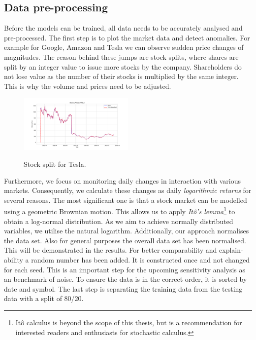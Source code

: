 \documentclass[12pt]{article}
\begin{document}
\subsection{Data pre-processing} %
\label{subsec:dataPre}
Before the models can be trained, all data needs to be accurately analysed and pre-processed. The first step is to plot the market data and detect anomalies. For example for Google, Amazon and Tesla we can observe sudden price changes of magnitudes. The reason behind these jumps are stock splits, where shares are split by an integer value to issue more stocks by the company. Shareholders do not lose value as the number of their stocks is multiplied by the same integer. This is why the volume and prices need to be adjusted.

\begin{figure}[h]
\centering
\includegraphics[width=0.50\textwidth]{figs/ctien_split.pdf}   \\
\caption{ Stock split for Tesla.}
\label{fig:finalnw}
\end{figure}

Furthermore, we focus on monitoring daily changes in interaction with various markets. Consequently, we calculate these changes as daily  \textit{logarithmic returns} for several reasons. The most significant one is that a stock market can be modelled using a geometric Brownian motion. This allows us to apply \textit{It\^{o}'s lemma}\footnote{It\^{o} calculus is beyond the scope of this thesis, but is a recommendation for interested readers and enthusiasts for stochastic calculus.} to obtain a log-normal distribution. As we aim to achieve normally distributed variables, we utilise the natural logarithm. Additionally, our approach normalises the data set. \cite{Joshi2008} \cite{Hull2021}
Also for general purposes the overall data set has been normalised. This will be demonstrated in the results.
For better comparability and explain-ability a random number has been added. It is constructed once and not changed for each seed. This is an important step for the upcoming sensitivity analysis as an benchmark of noise.
To ensure the data is in the correct order, it is sorted by date and symbol.
The last step is separating the training data from the testing data with a split of 80/20.
\end{document}

